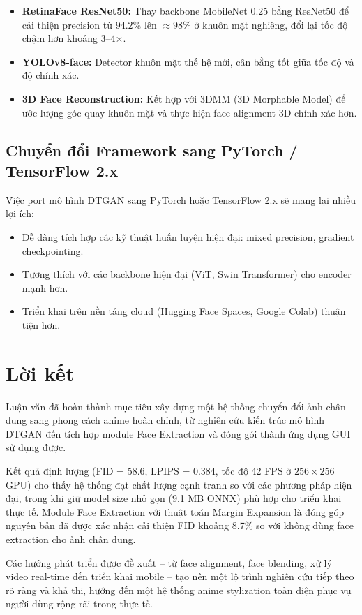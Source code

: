 \begin{itemize}
    \item \textbf{RetinaFace ResNet50:} Thay backbone MobileNet 0.25 bằng ResNet50 để cải thiện precision từ $94.2\%$ lên $\approx 98\%$ ở khuôn mặt nghiêng, đổi lại tốc độ chậm hơn khoảng 3--4$\times$.
    \item \textbf{YOLOv8-face:} Detector khuôn mặt thế hệ mới, cân bằng tốt giữa tốc độ và độ chính xác.
    \item \textbf{3D Face Reconstruction:} Kết hợp với 3DMM (3D Morphable Model) để ước lượng góc quay khuôn mặt và thực hiện face alignment 3D chính xác hơn.
\end{itemize}

\subsection{Chuyển đổi Framework sang PyTorch / TensorFlow 2.x}
\label{subsec:future_framework}

Việc port mô hình DTGAN sang PyTorch hoặc TensorFlow 2.x sẽ mang lại nhiều lợi ích:
\begin{itemize}
    \item Dễ dàng tích hợp các kỹ thuật huấn luyện hiện đại: mixed precision, gradient checkpointing.
    \item Tương thích với các backbone hiện đại (ViT, Swin Transformer) cho encoder mạnh hơn.
    \item Triển khai trên nền tảng cloud (Hugging Face Spaces, Google Colab) thuận tiện hơn.
\end{itemize}

\section{Lời kết}
\label{sec:final_word}

Luận văn đã hoàn thành mục tiêu xây dựng một hệ thống chuyển đổi ảnh chân dung sang phong cách anime hoàn chỉnh, từ nghiên cứu kiến trúc mô hình DTGAN đến tích hợp module Face Extraction và đóng gói thành ứng dụng GUI sử dụng được.

Kết quả định lượng (FID = 58.6, LPIPS = 0.384, tốc độ 42 FPS ở $256\times256$ GPU) cho thấy hệ thống đạt chất lượng cạnh tranh so với các phương pháp hiện đại, trong khi giữ model size nhỏ gọn (9.1 MB ONNX) phù hợp cho triển khai thực tế. Module Face Extraction với thuật toán Margin Expansion là đóng góp nguyên bản đã được xác nhận cải thiện FID khoảng 8.7\% so với không dùng face extraction cho ảnh chân dung.

Các hướng phát triển được đề xuất -- từ face alignment, face blending, xử lý video real-time đến triển khai mobile -- tạo nên một lộ trình nghiên cứu tiếp theo rõ ràng và khả thi, hướng đến một hệ thống anime stylization toàn diện phục vụ người dùng rộng rãi trong thực tế.
